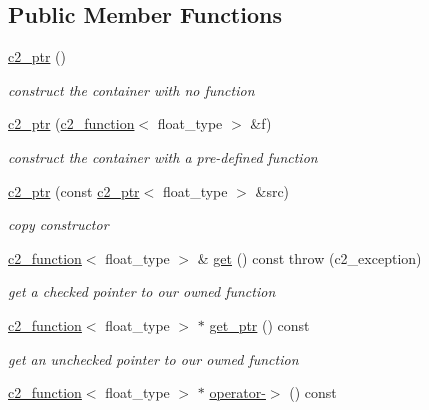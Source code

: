 \subsection*{Public Member Functions}
\begin{DoxyCompactItemize}
\item 
\hypertarget{classc2__ptr_ad49d9f28b27b26366c125973f5f7a8c1}{\hyperlink{classc2__ptr_ad49d9f28b27b26366c125973f5f7a8c1}{c2\-\_\-ptr} ()}\label{classc2__ptr_ad49d9f28b27b26366c125973f5f7a8c1}

\begin{DoxyCompactList}\small\item\em construct the container with no function \end{DoxyCompactList}\item 
\hyperlink{classc2__ptr_a43bb3a5a3c7d65127a4782d305c45d15}{c2\-\_\-ptr} (\hyperlink{classc2__function}{c2\-\_\-function}$<$ float\-\_\-type $>$ \&f)
\begin{DoxyCompactList}\small\item\em construct the container with a pre-\/defined function \end{DoxyCompactList}\item 
\hyperlink{classc2__ptr_a0b3aa488bd5a4388048f574c2ef19e60}{c2\-\_\-ptr} (const \hyperlink{classc2__ptr}{c2\-\_\-ptr}$<$ float\-\_\-type $>$ \&src)
\begin{DoxyCompactList}\small\item\em copy constructor \end{DoxyCompactList}\item 
\hypertarget{classc2__ptr_afa91b91ad5c8c3479b02699afbb46d26}{\hyperlink{classc2__function}{c2\-\_\-function}$<$ float\-\_\-type $>$ \& \hyperlink{classc2__ptr_afa91b91ad5c8c3479b02699afbb46d26}{get} () const   throw (c2\-\_\-exception)}\label{classc2__ptr_afa91b91ad5c8c3479b02699afbb46d26}

\begin{DoxyCompactList}\small\item\em get a checked pointer to our owned function \end{DoxyCompactList}\item 
\hypertarget{classc2__ptr_a74378bfb73076c3d49156fdbfa063618}{\hyperlink{classc2__function}{c2\-\_\-function}$<$ float\-\_\-type $>$ $\ast$ \hyperlink{classc2__ptr_a74378bfb73076c3d49156fdbfa063618}{get\-\_\-ptr} () const }\label{classc2__ptr_a74378bfb73076c3d49156fdbfa063618}

\begin{DoxyCompactList}\small\item\em get an unchecked pointer to our owned function \end{DoxyCompactList}\item 
\hypertarget{classc2__ptr_ade9595883ae73bfb22843c28045cb448}{\hyperlink{classc2__function}{c2\-\_\-function}$<$ float\-\_\-type $>$ $\ast$ \hyperlink{classc2__ptr_ade9595883ae73bfb22843c28045cb448}{operator-\/$>$} () const }\label{classc2__ptr_ade9595883ae73bfb22843c28045cb448}


\end{DoxyCompactItemize}
